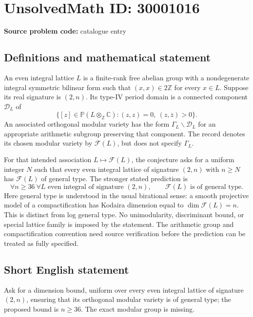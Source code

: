 \documentclass[11pt]{article}
\newcommand{\Z}{\mathbb{Z}}
\newcommand{\C}{\mathbb{C}}
\newcommand{\PP}{\mathbb{P}}
\begin{document}
\section*{UnsolvedMath ID: 30001016}
\textbf{Source problem code:} catalogue entry
\subsection{Definitions and mathematical statement}
An even integral lattice \(L\) is a finite-rank free abelian group with a nondegenerate integral symmetric bilinear form such that \((x,x)\in2\Z\) for every \(x\in L\). Suppose its real signature is \((2,n)\). Its type-IV period domain is a connected component \(\mathcal D_L\) of
\[
\{[z]\in\PP(L\otimes_\Z\C):(z,z)=0,\ (z,\overline z)>0\}.
\]
An associated orthogonal modular variety has the form \(\Gamma_L\backslash\mathcal D_L\) for an appropriate arithmetic subgroup preserving that component. The record denotes its chosen modular variety by \(\mathcal F(L)\), but does not specify \(\Gamma_L\).

For that intended association \(L\mapsto\mathcal F(L)\), the conjecture asks for a uniform integer \(N\) such that every even integral lattice of signature \((2,n)\) with \(n\geq N\) has \(\mathcal F(L)\) of general type. The stronger stated prediction is
\[
\forall n\geq36\ \forall L\text{ even integral of signature }(2,n),
\qquad \mathcal F(L)\text{ is of general type}.
\]
Here general type is understood in the usual birational sense: a smooth projective model of a compactification has Kodaira dimension equal to \(\dim\mathcal F(L)=n\). This is distinct from log general type. No unimodularity, discriminant bound, or special lattice family is imposed by the statement. The arithmetic group and compactification convention need source verification before the prediction can be treated as fully specified.
\subsection{Short English statement}
Ask for a dimension bound, uniform over every even integral lattice of signature \((2,n)\), ensuring that its orthogonal modular variety is of general type; the proposed bound is \(n\geq36\). The exact modular group is missing.
\end{document}
